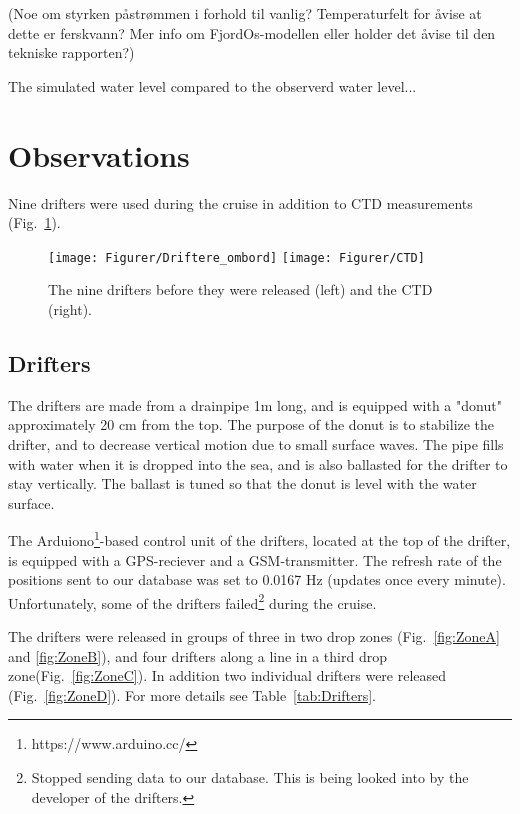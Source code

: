 \documentclass[12pt,a4paper,english]{article}
\begin{document}
(Noe om styrken p\aa str\o mmen i forhold til vanlig? Temperaturfelt for \aa vise at dette er ferskvann? Mer info om FjordOs-modellen eller holder det \aa vise til den tekniske rapporten?)

The simulated water level compared to the observerd water level...


\section{Observations}
Nine drifters were used during the cruise in addition to CTD measurements (Fig.~\ref{fig:Utstyr}). %

\begin{figure}[tb]
\centerline{
\texttt{[image: Figurer/Driftere\_ombord]}
\texttt{[image: Figurer/CTD]}
}
\caption{\small
The nine drifters before they were released (left) and the CTD (right).}
\label{fig:Utstyr}
\end{figure}

\subsection{Drifters}
The drifters are made from a drainpipe 1m long, and is equipped with a "donut" approximately 20 cm from the top. The purpose of the donut is to stabilize the drifter, and to decrease vertical motion due to small surface waves. The pipe fills with water when it is dropped into the sea, and is also ballasted for the drifter to stay vertically. The ballast is tuned so that the donut is level with the water surface.

The Arduiono\footnote{https://www.arduino.cc/}-based control unit of the drifters, located at the top of the drifter, is equipped with a GPS-reciever and a GSM-transmitter. The refresh rate of the positions sent to our database was set to 0.0167 Hz (updates once every minute). Unfortunately, some of the drifters failed\footnote{Stopped sending data to our database. This is being looked into by the developer of the drifters.} during the cruise.

The drifters were released in groups of three in two drop zones (Fig.~\ref{fig:ZoneA} and \ref{fig:ZoneB}), and four drifters along a line in a third drop zone(Fig.~\ref{fig:ZoneC}). In addition two individual drifters were released (Fig.~\ref{fig:ZoneD}). For more details see Table~\ref{tab:Drifters}.
\end{document}
